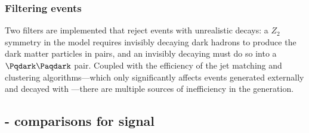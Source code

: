 

\subsubsection{Filtering events}
\label{subsubsec:svj_pythia_filters}

Two filters are implemented that reject events with unrealistic decays: a $Z_2$ symmetry in the model requires invisibly decaying dark hadrons to produce the dark matter particles in pairs, and an invisibly decaying \PZprime must do so into a $\Pqdark\Paqdark$ pair. Coupled with the efficiency of the \gls{jet} matching and clustering algorithms---which only significantly affects events generated externally and decayed with \PYTHIA---there are multiple sources of inefficiency in the generation.




\subsection{\texorpdfstring{\PYTHIA}{Pythia}-\texorpdfstring{\MADGRAPH}{MadGraph} comparisons for \texorpdfstring{\schannel}{s-channel} signal}
\label{subsec:svj_schannel_comparisons}



